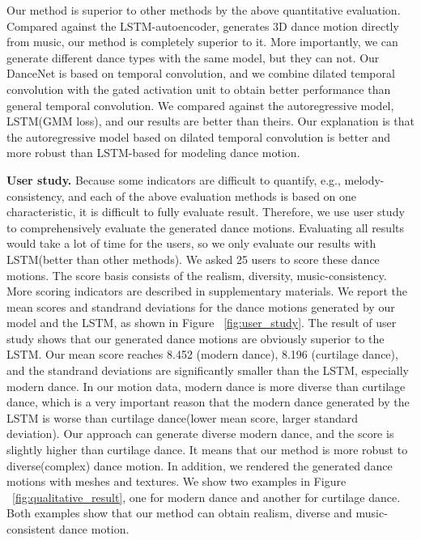 Our method is superior to other methods by the above quantitative evaluation. Compared against the LSTM-autoencoder\cite{tang2018dance}, generates 3D dance motion directly from music, our method is completely superior to it. More importantly, we can generate different dance types with the same model, but they can not. Our DanceNet is based on temporal convolution, and we combine dilated temporal convolution with the gated activation unit to obtain better performance than general temporal convolution\cite{ginosar2019learning}. We compared against the autoregressive model, LSTM(GMM loss)\cite{lee2018interactive}, and our results are better than theirs. Our explanation is that the autoregressive model based on dilated temporal convolution is better and more robust than LSTM-based for modeling dance  motion.





\textbf{User study.} Because some indicators are difficult to quantify, e.g., melody-consistency, and each of the above evaluation methods is based on one characteristic, it is difficult to fully evaluate result. Therefore, we use user study to comprehensively evaluate the generated dance motions. Evaluating all results would take a lot of time for the users, so we only evaluate our results with LSTM\cite{lee2018interactive}(better than other methods).
We asked 25 users to score these dance motions. The score basis consists of the realism, diversity, music-consistency. More scoring indicators are described in supplementary materials. 
We report the mean scores and standrand deviations for the dance motions generated by
our model and the LSTM, as shown in Figure ~\ref{fig:user_study}. The result of user study shows 
that our generated dance motions are obviously superior to the LSTM.
Our mean score reaches 8.452 (modern dance), 8.196 (curtilage dance), and the standrand deviations
are significantly smaller than the LSTM, especially modern dance.
In our motion data, modern dance is more diverse than curtilage dance, which is a very important reason that the modern dance generated by the LSTM is worse than curtilage dance(lower mean score, larger standard deviation). Our approach can generate diverse modern dance, and the score is slightly higher than curtilage dance. It means that our method is more robust to diverse(complex) dance motion. In addition, we rendered the generated dance motions with meshes and textures. We show two examples in Figure ~\ref{fig:qualitative_result}, one for modern dance and another for curtilage dance. Both examples show that our method can obtain 
realism, diverse and music-consistent dance motion.












